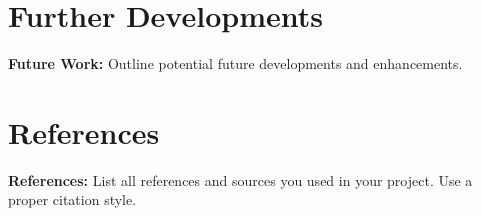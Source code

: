 \documentclass[12pt]{article}
\begin{document}
	\section{Further Developments}
	\textbf{Future Work:} Outline potential future developments and enhancements.
	
	\section{References}
	\textbf{References:} List all references and sources you used in your project. Use a proper citation style.
	
\end{document}
